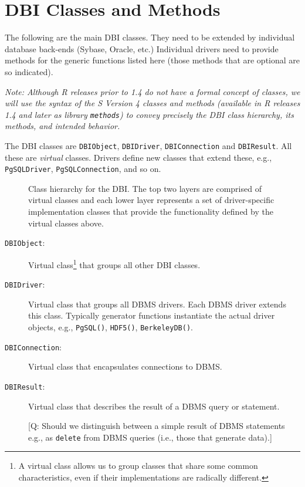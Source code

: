 \documentclass[graphics,times,psfig,dvips,hyper]{article}
\newcommand{\sfun}[1]{\mbox{\tt #1()}}  %
\newcommand{\sobj}[1]{\mbox{\tt #1}}    %
\newcommand{\sclass}[1]{\mbox{\tt #1}}  %
\begin{document}
\section{DBI Classes and Methods}\label{sec:DBIClasses}
The following are the main DBI classes. They need to be extended
by individual database back-ends (Sybase, Oracle, etc.)  Individual
drivers need to provide methods for the generic functions listed here
(those methods that are optional are so indicated).

\emph{Note: Although R releases prior to 1.4 do not have a formal
concept of classes, we will use the syntax of the S Version
4 classes and methods (available in R releases 1.4 and later as
library \sobj{methods}) to convey precisely the DBI class hierarchy,
its methods, and intended behavior.  
}

The DBI classes are \sclass{DBIObject}, \sclass{DBIDriver},
\sclass{DBIConnection} and \sclass{DBIResult}. All these are
\emph{virtual} classes.  Drivers define new classes that extend
these, e.g., \sclass{PgSQLDriver}, \sclass{PgSQLConnection}, and
so on.
\begin{figure}
\caption{Class hierarchy for the DBI. The top two layers
are comprised of virtual classes and each lower layer represents
a set of driver-specific implementation classes that provide
the functionality defined by the virtual classes above.}
\end{figure}
\begin{description}
\item[\sclass{DBIObject}:]
  Virtual class\footnote{A virtual class allows us to group
  classes that share some common characteristics, even if their
  implementations are radically different.} that groups all other
  DBI classes.

\item[\sclass{DBIDriver}:]
  Virtual class that groups all DBMS drivers. Each DBMS driver
  extends this class.  Typically generator functions instantiate
  the actual driver objects, e.g., \sfun{PgSQL}, \sfun{HDF5}, 
  \sfun{BerkeleyDB}.

\item[\sclass{DBIConnection}:]
  Virtual class that encapsulates connections to DBMS.

\item[\sclass{DBIResult}:]
  Virtual class that describes the result of a DBMS query or statement.  

  [Q: Should we distinguish between a simple result of DBMS statements 
  e.g., as \texttt{delete} from DBMS queries (i.e., those that generate 
  data).]

\end{description} 
\end{document}
